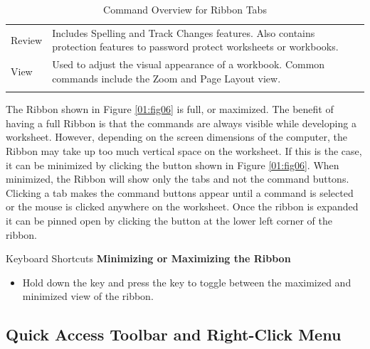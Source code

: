 \begin{table}[H]
{\begin{longtable}{L{0.75in}L{3.50in}}
			Review & Includes Spelling and Track Changes features. Also contains protection features to password protect worksheets or workbooks.\\
			
			View & Used to adjust the visual appearance of a workbook. Common commands include the Zoom and Page Layout view.\\

			\caption{Command Overview for Ribbon Tabs}
			\label{01:tab01}
		\end{longtable}
	} %
\end{table}

The Ribbon shown in Figure \ref{01:fig06} is full, or maximized. The benefit of having a full Ribbon is that the commands are always visible while developing a worksheet. However, depending on the screen dimensions of the computer, the Ribbon may take up too much vertical space on the worksheet. If this is the case, it can be minimized by clicking the button shown in Figure \ref{01:fig06}. When minimized, the Ribbon will show only the tabs and not the command buttons. Clicking a tab makes the command buttons appear until a command is selected or the mouse is clicked anywhere on the worksheet. Once the ribbon is expanded it can be pinned open by clicking the  button at the lower left corner of the ribbon.

\begin{center}
	\begin{shtcutbox}{Keyboard Shortcuts}
		\textbf{Minimizing or Maximizing the Ribbon}
		\\
		\begin{itemize}
			\setlength{\itemsep}{0pt}
			\setlength{\parskip}{0pt}
			\setlength{\parsep}{0pt}
			
			\item Hold down the  key and press the  key to toggle between the maximized and minimized view of the ribbon.
			
		\end{itemize}
	\end{shtcutbox}
\end{center}

\subsection{Quick Access Toolbar and Right-Click Menu}

